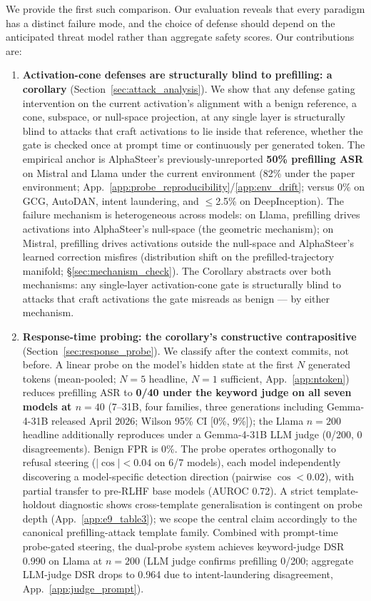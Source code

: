 \documentclass{article}
\begin{document}
We provide the first such comparison. Our evaluation reveals that every paradigm has a distinct failure mode, and the choice of defense should depend on the anticipated threat model rather than aggregate safety scores. Our contributions are:

\begin{enumerate}
    \item \textbf{Activation-cone defenses are structurally blind to prefilling: a corollary} (Section~\ref{sec:attack_analysis}). We show that any defense gating intervention on the current activation's alignment with a benign reference, a cone, subspace, or null-space projection, at any single layer is structurally blind to attacks that craft activations to lie inside that reference, whether the gate is checked once at prompt time or continuously per generated token. The empirical anchor is AlphaSteer's previously-unreported \textbf{50\% prefilling ASR} on Mistral and Llama under the current environment (82\% under the paper environment; App.~\ref{app:probe_reproducibility}/\ref{app:env_drift}; versus 0\% on GCG, AutoDAN, intent laundering, and $\leq$2.5\% on DeepInception). The failure mechanism is heterogeneous across models: on Llama, prefilling drives activations into AlphaSteer's null-space (the geometric mechanism); on Mistral, prefilling drives activations outside the null-space and AlphaSteer's learned correction misfires (distribution shift on the prefilled-trajectory manifold; \S\ref{sec:mechanism_check}). The Corollary abstracts over both mechanisms: any single-layer activation-cone gate is structurally blind to attacks that craft activations the gate misreads as benign --- by either mechanism.
    \item \textbf{Response-time probing: the corollary's constructive contrapositive} (Section~\ref{sec:response_probe}). We classify after the context commits, not before. A linear probe on the model's hidden state at the first $N$ generated tokens (mean-pooled; $N=5$ headline, $N=1$ sufficient, App.~\ref{app:ntoken}) reduces prefilling ASR to \textbf{0/40 under the keyword judge on all seven models at $n=40$} (7--31B, four families, three generations including Gemma-4-31B released April 2026; Wilson 95\% CI [0\%, 9\%]); the Llama $n=200$ headline additionally reproduces under a Gemma-4-31B LLM judge (0/200, 0 disagreements). Benign FPR is 0\%. The probe operates orthogonally to refusal steering ($|\cos| < 0.04$ on 6/7 models), each model independently discovering a model-specific detection direction (pairwise $\cos < 0.02$), with partial transfer to pre-RLHF base models (AUROC 0.72). A strict template-holdout diagnostic shows cross-template generalisation is contingent on probe depth (App.~\ref{app:e9_table3}); we scope the central claim accordingly to the canonical prefilling-attack template family. Combined with prompt-time probe-gated steering, the dual-probe system achieves keyword-judge DSR 0.990 on Llama at $n=200$ (LLM judge confirms prefilling 0/200; aggregate LLM-judge DSR drops to 0.964 due to intent-laundering disagreement, App.~\ref{app:judge_prompt}).

\end{enumerate}
\end{document}
